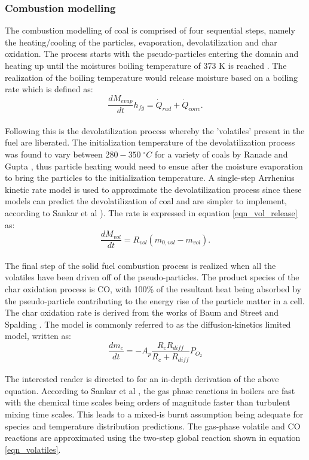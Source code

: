 \documentclass{webofc}
\begin{document}
\subsubsection{Combustion modelling}
The combustion modelling of coal is comprised of four sequential steps, namely the heating/cooling of the particles, evaporation, devolatilization and char oxidation. The process starts with the pseudo-particles entering the domain and heating up until the moistures boiling temperature of 373 K is reached \cite{cengel}. The realization of the boiling temperature would release moisture based on a boiling rate which is defined as:
\\
\begin{equation}\label{eqn_evap_release}
\frac{dM_{evap}}{dt}h_{fg}=\dot{Q}_{rad} + \dot{Q}_{conv}.
\end{equation}
\\
Following this is the devolatilization process whereby the 'volatiles' present in the fuel are liberated. The initialization temperature of the devolatilization process was found to vary between $280 - 350\;^{\circ}C$ for a variety of coals by Ranade and Gupta \cite{gupta}, thus particle heating would need to ensue after the moisture evaporation to bring the particles to the initialization temperature. A single-step Arrhenius kinetic rate model is used to approximate the devolatilization process since these models can predict the devolatilization of coal and are simpler to implement, according to Sankar et al \cite{sankar}). The rate is expressed in equation \ref{eqn_vol_release} as:\\
\begin{equation}\label{eqn_vol_release}
\frac{dM_{vol}}{dt}=R_{vol}(m_{0,vol}-m_{vol}).
\end{equation}\\
The final step of the solid fuel combustion process is realized when all the volatiles have been driven off of the pseudo-particles. The product species of the char oxidation process is CO, with 100\% of the resultant heat being absorbed by the pseudo-particle contributing to the energy rise of the particle matter in a cell. The char oxidation rate is derived from the works of Baum and Street \cite{baum} and Spalding \cite{spalding}. The model is commonly referred to as the diffusion-kinetics limited model, written as:
\begin{equation}\label{eqn_char_release}
\frac{dm_c}{dt}=-A_{p}\frac{R_{c}R_{diff}}{R_{c}+R_{diff}}P_{O_{2}}
\end{equation}
\\
The interested reader is directed to \cite{ansys} for an in-depth derivation of the above equation. According to Sankar et al \cite{sankar}, the gas phase reactions in boilers are fast with the chemical time scales being orders of magnitude faster than turbulent mixing time scales. This leads to a mixed-is burnt assumption being adequate for species and temperature distribution predictions. The gas-phase volatile and CO reactions are approximated using the two-step global reaction shown in equation \ref{eqn_volatiles}. 
\end{document}

